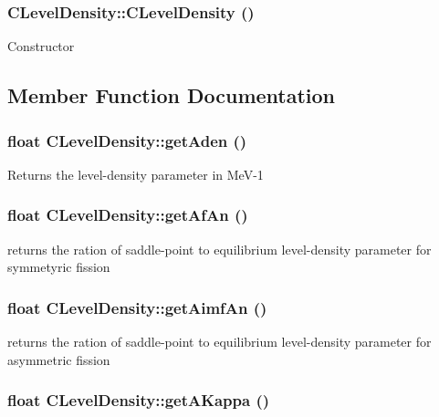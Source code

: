 \subsubsection{\setlength{\rightskip}{0pt plus 5cm}CLevel\-Density::CLevel\-Density ()}\label{classCLevelDensity_e6428caecb1135b705ac39adf873b135}


Constructor 

\subsection{Member Function Documentation}
\subsubsection{\setlength{\rightskip}{0pt plus 5cm}float CLevel\-Density::get\-Aden ()}\label{classCLevelDensity_29ce0edb568e2c2e261438e99dbebb81}


Returns the level-density parameter in Me\-V-1 
\subsubsection{\setlength{\rightskip}{0pt plus 5cm}float CLevel\-Density::get\-Af\-An ()\hspace{0.3cm}{\tt  [static]}}\label{classCLevelDensity_812ad4c5a5c2c41006a513a68a274d4b}


returns the ration of saddle-point to equilibrium level-density parameter for symmetyric fission 
\subsubsection{\setlength{\rightskip}{0pt plus 5cm}float CLevel\-Density::get\-Aimf\-An ()\hspace{0.3cm}{\tt  [static]}}\label{classCLevelDensity_b5ae5183066b912f311399fee5f430ac}


returns the ration of saddle-point to equilibrium level-density parameter for asymmetric fission 
\subsubsection{\setlength{\rightskip}{0pt plus 5cm}float CLevel\-Density::get\-AKappa ()\hspace{0.3cm}{\tt  [static]}}\label{classCLevelDensity_d4b025eeaf50b2609a5f4a1aa2e1c695}


